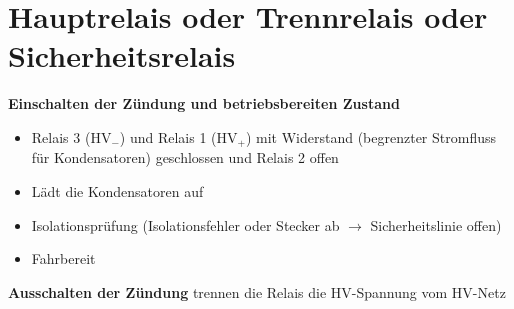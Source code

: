 \section{Hauptrelais oder Trennrelais oder
Sicherheitsrelais}\label{hauptrelais-oder-trennrelais-oder-sicherheitsrelais}

\textbf{Einschalten der Zündung und betriebsbereiten Zustand}

\begin{itemize}
\item
  Relais 3 ($\text{HV}_-$) und Relais 1 ($\text{HV}_+$) mit
  Widerstand (begrenzter Stromfluss für Kondensatoren) geschlossen und
  Relais 2 offen
\item
  Lädt die Kondensatoren auf
\item
  Isolationsprüfung (Isolationsfehler oder Stecker ab $\to$
  Sicherheitslinie offen)
\item
  Fahrbereit
\end{itemize}

\textbf{Ausschalten der Zündung} trennen die Relais die HV-Spannung vom
HV-Netz
